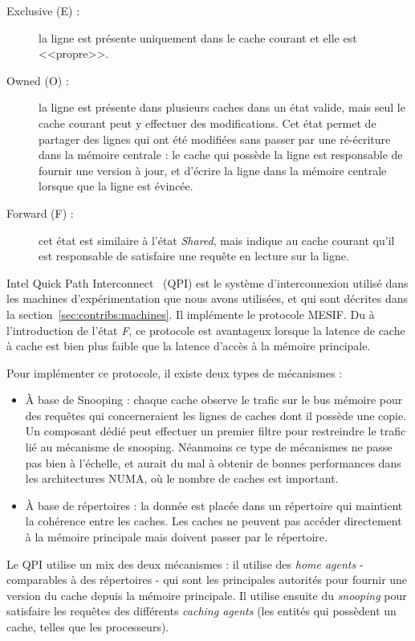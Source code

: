 \begin{description}
  \item [Exclusive (E) :] la ligne est présente uniquement dans le cache courant et elle est <<propre>>.
  \item [Owned (O) :] la ligne est présente dans plusieurs caches dans un état valide, mais seul le cache courant peut y effectuer des modifications.
    Cet état permet de partager des lignes qui ont été modifiées sans passer par une ré-écriture dans la mémoire centrale : le cache qui possède la ligne est responsable de fournir une version à jour, et d'écrire la ligne dans la mémoire centrale lorsque que la ligne est évincée.
  \item [Forward (F) :] cet état est similaire à l'état \emph{Shared}, mais indique au cache courant qu'il est responsable de satisfaire une requête en lecture sur la ligne.
\end{description}

Intel Quick Path Interconnect~\cite{Ziakas2010} (QPI) est le système d'interconnexion utilisé dans les machines d'expérimentation que nous avons utilisées, et qui sont décrites dans la section~\ref{sec:contribs:machines}.
Il implémente le protocole MESIF. Du à l'introduction de l'état \emph{F}, ce protocole est avantageux lorsque la latence de cache à cache est bien plus faible que la latence d'accès à la mémoire principale.

Pour implémenter ce protocole, il existe deux types de mécanismes :

\begin{itemize}
  \item À base de Snooping : chaque cache observe le trafic sur le bus mémoire pour des requêtes qui concerneraient les lignes de caches dont il possède une copie. Un composant dédié peut effectuer un premier filtre pour restreindre le trafic lié au mécanisme de snooping. Néanmoins ce type de mécanismes ne passe pas bien à l'échelle, et aurait du mal à obtenir de bonnes performances dans les architectures NUMA, où le nombre de caches est important.

  \item À base de répertoires : la donnée est placée dans un répertoire qui maintient la cohérence entre les caches. Les caches ne peuvent pas accéder directement à la mémoire principale mais doivent passer par le répertoire.
\end{itemize}

Le QPI utilise un mix des deux mécanismes : il utilise des \emph{home agents} - comparables à des répertoires - qui sont les principales autorités pour fournir une version du cache depuis la mémoire principale.
Il utilise ensuite du \emph{snooping} pour satisfaire les requêtes des différents \emph{caching agents} (les entités qui possèdent un cache, telles que les processeurs).

